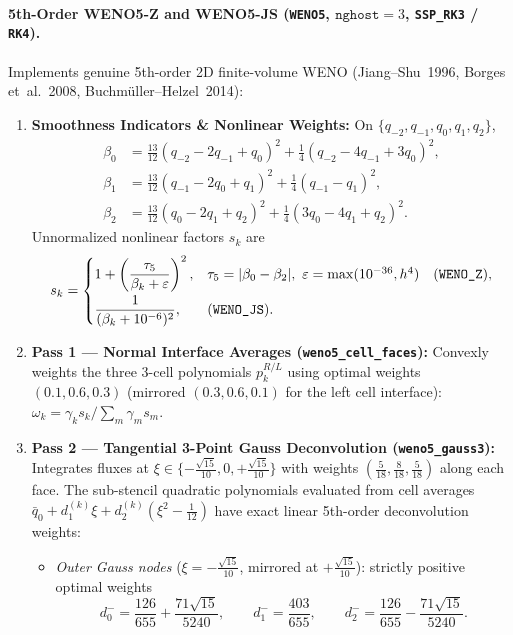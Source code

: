 \documentclass[11pt,a4paper]{article}
\theoremstyle{definition}
\newcommand{\code}[1]{\texttt{#1}}
\begin{document}
\paragraph{5th-Order WENO5-Z and WENO5-JS (\code{WENO5}, $\code{nghost}=3$, \code{SSP\_RK3} / \code{RK4}).}
Implements genuine 5th-order 2D finite-volume WENO (Jiang--Shu~1996, Borges et~al.~2008, Buchm\"uller--Helzel~2014):
\begin{enumerate}
\item \textbf{Smoothness Indicators \& Nonlinear Weights:} On $\{q_{-2}, q_{-1}, q_0, q_1, q_2\}$,
\begin{align*}
\beta_0 &= \tfrac{13}{12}(q_{-2} - 2q_{-1} + q_0)^2 + \tfrac{1}{4}(q_{-2} - 4q_{-1} + 3q_0)^2,\\
\beta_1 &= \tfrac{13}{12}(q_{-1} - 2q_0 + q_1)^2 + \tfrac{1}{4}(q_{-1} - q_1)^2,\\
\beta_2 &= \tfrac{13}{12}(q_0 - 2q_1 + q_2)^2 + \tfrac{1}{4}(3q_0 - 4q_1 + q_2)^2.
\end{align*}
Unnormalized nonlinear factors $s_k$ are
\[
s_k = \begin{cases}
1 + \left(\dfrac{\tau_5}{\beta_k + \varepsilon}\right)^2, & \tau_5 = |\beta_0 - \beta_2|,\ \varepsilon = \max(10^{-36}, h^4)\quad (\text{\code{WENO\_Z}}),\\[8pt]
\dfrac{1}{(\beta_k + 10^{-6})^2}, & (\text{\code{WENO\_JS}}).
\end{cases}
\]
\item \textbf{Pass 1 — Normal Interface Averages (\code{weno5\_cell\_faces}):} Convexly weights the three 3-cell polynomials $p_k^{R/L}$ using optimal weights $(0.1, 0.6, 0.3)$ (mirrored $(0.3, 0.6, 0.1)$ for the left cell interface): $\omega_k = \gamma_k s_k / \sum_m \gamma_m s_m$.
\item \textbf{Pass 2 — Tangential 3-Point Gauss Deconvolution (\code{weno5\_gauss3}):} Integrates fluxes at $\xi \in \{-\frac{\sqrt{15}}{10}, 0, +\frac{\sqrt{15}}{10}\}$ with weights $(\frac{5}{18}, \frac{8}{18}, \frac{5}{18})$ along each face. The sub-stencil quadratic polynomials evaluated from cell averages $\bar{q}_0 + d_1^{(k)}\xi + d_2^{(k)}(\xi^2 - \frac{1}{12})$ have exact linear 5th-order deconvolution weights:
  \begin{itemize}
    \item \emph{Outer Gauss nodes} ($\xi = -\frac{\sqrt{15}}{10}$, mirrored at $+\frac{\sqrt{15}}{10}$): strictly positive optimal weights
    \[
    d_0^- = \frac{126}{655} + \frac{71\sqrt{15}}{5240}, \qquad
    d_1^- = \frac{403}{655}, \qquad
    d_2^- = \frac{126}{655} - \frac{71\sqrt{15}}{5240}.
\]
\end{itemize}
\end{enumerate}
\end{document}
